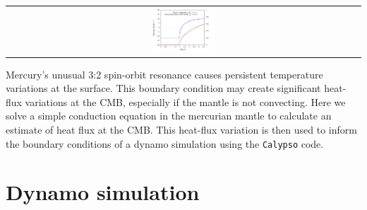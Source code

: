 \documentclass[landscape,a0b,final]{a0poster}
\begin{document}
\begin{multicols}{3}

\begin{center}
\begin{tabular}{c}
 \includegraphics[width=0.18\textwidth]{entropy_fig.png} 
\end{tabular}
\label{entropy}
\end{center}

\columnbreak

Mercury's unusual 3:2 spin-orbit resonance causes persistent temperature variations at the surface.  This boundary condition may create significant heat-flux variations at the CMB, especially if the mantle is not convecting.  Here we solve a simple conduction equation in the mercurian mantle to calculate an estimate of heat flux at the CMB.  This heat-flux variation is then used to inform the boundary conditions of a dynamo simulation using the \texttt{Calypso} code.

\section*{Dynamo simulation}


\end{multicols}
\end{document}
